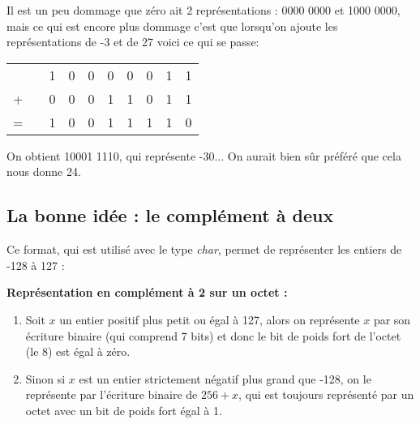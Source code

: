 \documentclass[a4paper,12pt,french]{book}
\begin{document}
Il est un peu dommage que zéro ait 2 représentations : 0000 0000 et 1000 0000, mais ce qui est encore plus dommage
c'est que lorsqu'on ajoute les représentations de -3 et de 27 voici ce qui se passe:
\begin{center}

\begin{tabular}{cccccccccc}
 &  & 1 & 0 & 0 & 0 & 0 & 0 & 1 & 1 \\

+ &  & 0 & 0 & 0 & 1 & 1 & 0 & 1 & 1 \\
\hline
= &  & 1 & 0 & 0 & 1 & 1 & 1 & 1 & 0 \\
\end{tabular}

\end{center}

On obtient 10001 1110, qui représente -30... On aurait bien sûr préféré que cela nous donne 24.

\subsection{La bonne idée : le complément à deux}

Ce format, qui est utilisé avec le type \textit{char}, permet de représenter les entiers de -128 à 127 :

\begin{propriete} \textbf{Représentation en complément à 2 sur un octet :}
\begin{enumerate}[\textbullet]
	\item Soit $x$ un entier positif plus petit ou égal à 127, alors on représente $x$ par son écriture binaire (qui
	comprend 7 bits) et donc le bit de poids fort de l'octet (le 8\eme) est égal à zéro.
	\item Sinon si $x$ est un entier strictement négatif plus grand que -128, on le représente par l'écriture binaire
	de $256+x$, qui est toujours représenté par un octet avec un bit de poids fort égal à 1.
\end{enumerate}
\end{propriete}
\end{document}
